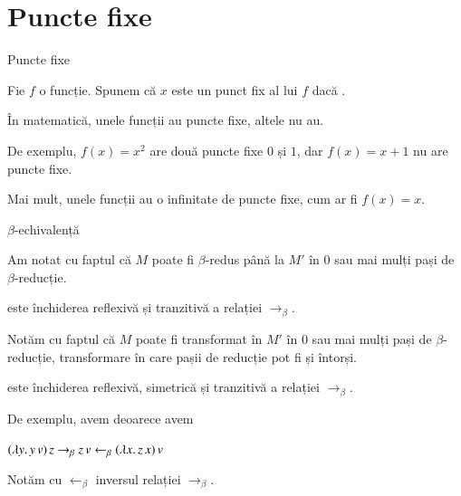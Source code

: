 \documentclass[xcolor=pdftex,romanian,colorlinks]{beamer}
\begin{document}
\section{\color{section-color} \large Puncte fixe}

\begin{frame}{Puncte fixe}

Fie $f$ o funcție. 
%
Spunem că $x$ este un \alert{punct fix} al lui $f$ dacă .

În matematică, unele funcții au puncte fixe, altele nu au.

De exemplu, $f(x) = x^2$ are două puncte fixe $0$ și $1$, dar $f(x) = x+1$ nu are puncte fixe.

Mai mult, unele funcții au o infinitate de puncte fixe, cum ar fi $f(x)=x$.

\end{frame}

\begin{frame}{$\beta$-echivalență}


Am notat cu  faptul că $M$ poate fi $\beta$-redus până la $M'$ în $0$ sau mai mulți pași  de $\beta$-reducție.

\intens{$\twoheadrightarrow_\beta$}  este închiderea reflexivă și tranzitivă a relației $\rightarrow_\beta$.

\medskip
Notăm cu  faptul că $M$ poate fi transformat în $M'$ în $0$ sau mai mulți pași de $\beta$-reducție, transformare în care pașii de reducție pot fi  și întorși. 

 \intens{$=_\beta$} este închiderea reflexivă, simetrică și tranzitivă a relației $\rightarrow_\beta$.

De exemplu, avem  deoarece avem
\vspace{-.2cm}
\begin{center}
$(\lambda y.\,y\, v)\, z \rightarrow_\beta z\, v \leftarrow_\beta (\lambda x.\,z\, x)\, v$
\end{center}
\vspace{-.2cm}
Notăm cu $\leftarrow_\beta$ inversul relației $\rightarrow_\beta$.

\end{frame}
\end{document}
